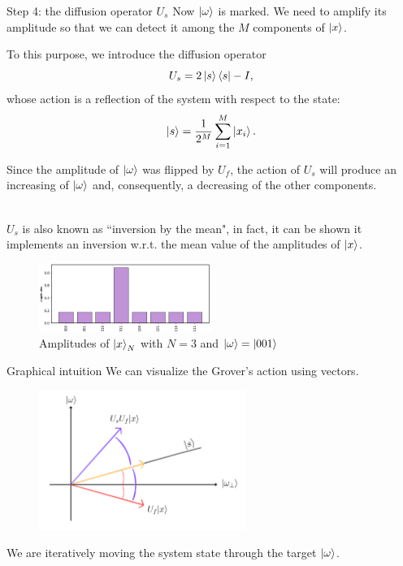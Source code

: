 \documentclass[aspectratio=169, 8pt, xcolor={svgnames}, hyperref={linkcolor=black}]{beamer}
\begin{document}
\begin{frame}{Step 4: the diffusion operator $U_s$}
Now $\ket{\omega}$ is marked. We need to amplify its amplitude so that we can
detect it among the $M$ components of $\ket{x}$. \pause

To this purpose, we introduce the diffusion operator
$$ U_s =  2 \ket{s}\bra{s} - I, $$
whose action is a reflection of the system with respect to the state:
$$ \ket{s} = \frac{1}{2^{M}}\sum_{i=1}^{M} \ket{x_i}. $$ \pause

Since the amplitude of $\ket{\omega}$ was flipped by $U_f$, the action of $U_s$
will produce an increasing of $\ket{\omega}$ and, consequently, a decreasing of the
other components. \pause

\begin{multicols}{2}
\textit{\\}
$U_s$ is also known as \textcolor{carnelian}{``inversion by the mean"}, in fact, it can be shown
it implements an inversion w.r.t. the mean value of the amplitudes of $\ket{x}$.
\begin{figure}
   \includegraphics[width=0.5\textwidth]{figures/state3.png}
   \caption*{Amplitudes of $\ket{x}_N$ with $N=3$ and $\ket{\omega} = \ket{001}$}
\end{figure}
\end{multicols}
\end{frame}

\begin{frame}{Graphical intuition}
We can visualize the Grover's action using vectors.
\begin{figure}
   \includegraphics[width=0.6\textwidth]{figures/vectors.png}
\end{figure}
We are iteratively moving the system state through the target $\ket{\omega}$.
\end{frame}
\end{document}
